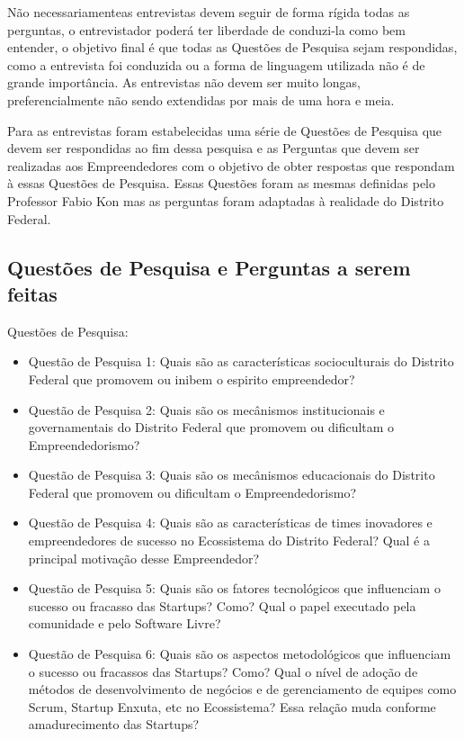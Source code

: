 Não necessariamenteas entrevistas devem seguir de forma rígida todas as perguntas, o entrevistador poderá ter liberdade de conduzi-la como bem entender, o objetivo final é que todas as Questões de Pesquisa
sejam respondidas, como a entrevista foi conduzida ou a forma de linguagem utilizada não é de grande importância. As entrevistas não devem ser muito longas, preferencialmente não sendo extendidas por mais
de uma hora e meia.

Para as entrevistas foram estabelecidas uma série de Questões de Pesquisa que devem ser respondidas ao fim dessa pesquisa e as Perguntas que devem ser realizadas aos Empreendedores com o objetivo de
obter respostas que respondam à essas Questões de Pesquisa. Essas Questões foram as mesmas definidas pelo Professor Fabio Kon mas as perguntas foram adaptadas à realidade do Distrito Federal.

\subsection{Questões de Pesquisa e Perguntas a serem feitas}
\label{subsection:questoes_de_pesquisa_e_perguntas}

Questões de Pesquisa:
\begin{itemize}
  \item Questão de Pesquisa 1: Quais são as características socioculturais do Distrito Federal que promovem ou inibem o espirito empreendedor?
  \item Questão de Pesquisa 2: Quais são os mecânismos institucionais e governamentais do Distrito Federal que promovem ou dificultam o Empreendedorismo?
  \item Questão de Pesquisa 3: Quais são os mecânismos educacionais do Distrito Federal que promovem ou dificultam o Empreendedorismo?
  \item Questão de Pesquisa 4: Quais são as características de times inovadores e empreendedores de sucesso no Ecossistema do Distrito Federal? Qual é a principal motivação desse Empreendedor?
  \item Questão de Pesquisa 5: Quais são os fatores tecnológicos que influenciam o sucesso ou fracasso das Startups? Como? Qual o papel executado pela comunidade e pelo Software Livre?
  \item Questão de Pesquisa 6: Quais são os aspectos metodológicos que influenciam o sucesso ou fracassos das Startups? Como? Qual o nível de adoção de métodos de desenvolvimento de negócios
  e de gerenciamento de equipes como Scrum, Startup Enxuta, etc no Ecossistema? Essa relação muda conforme amadurecimento das Startups?
\end{itemize}


